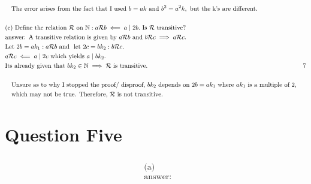 \documentclass{article}
\begin{document}
\begin{align*}
            &\quad\text{The error arises from the fact that I used }b = ak \text{ and } b^2 = a^2k,\text{ but the k's are different.}\\
            &\\
            &\text{(e) Define the relation }\rel \text{ on }\N : a\rel b \impliedby a\mid 2b. \text{ Is }\rel \text{ transitive?}\\
            &\text{answer: A transitive relation is given by }a\rel b\text{ and } b \rel c \implies a\rel c.\\
            &\text{Let } 2b = ak_1 : a\rel b \AND\LET 2c = bk_2 : b \rel c.\\
            &a \rel c \impliedby a \mid 2c \text{ which yields } a\mid bk_2.\\
            &\text{Its already given that }bk_2\inn\implies \rel \text{ is transitive.}& \xmark\\
            &\\
            &\quad\text{Unsure as to why I stopped the proof/ disproof, }bk_2\text{ depends on } 2b=ak_1\text{ where } ak_1 \text{ is a multiple of 2,}\\
            &\quad\text{which may not be true. Therefore, }\rel \text{ is not transitive.}\\
        \end{align*}
    
    \section{Question Five}
        \begin{align*}
            &\\
            &\text{(a) }\\
            &\text{answer: }\\
        \end{align*}
\end{document}
